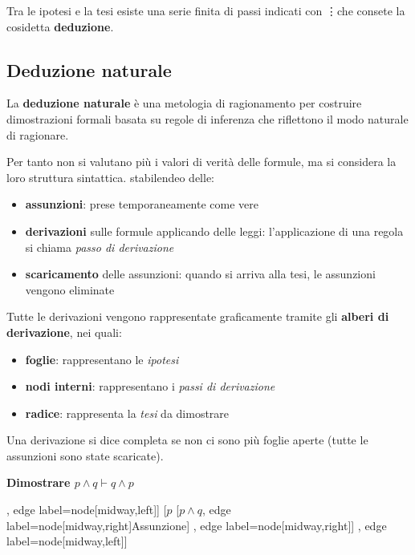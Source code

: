 \documentclass[a4paper, 12pt]{book}
\newcommand{\definizione}[2]{%
\vspace{15pt}%
\begin{tcolorbox}[
  colback=cyan!5!white,
  colframe=blue!50!black,
  title=\textbf{Definizione: #1}, %
  coltitle=white,
  fonttitle=\bfseries,
  arc=3mm,
  boxrule=0.5pt,
  enhanced,
  breakable
]
#2 %
\end{tcolorbox}
\vspace{15pt}%
}
\newcommand{\esempio}[2]{%
  \begin{center}
    \textbf{#1}\par
    #2
  \end{center}
}
\begin{document}
  Tra le ipotesi e la tesi esiste una serie finita di passi indicati con \vdots che consete la cosidetta \textbf{deduzione}.

  \subsection*{Deduzione naturale}
  La \textbf{deduzione naturale} è una metologia di ragionamento per costruire dimostrazioni formali basata su regole di inferenza che riflettono il modo naturale di ragionare.

  Per tanto non si valutano più i valori di verità delle formule, ma si considera la loro struttura sintattica. stabilendeo delle:
  \begin{itemize}
    \item \textbf{assunzioni}: prese temporaneamente come vere
    \item \textbf{derivazioni} sulle formule applicando delle leggi: l'applicazione di una regola si chiama \textit{passo di derivazione}
    \item \textbf{scaricamento} delle assunzioni: quando si arriva alla tesi, le assunzioni vengono eliminate
  \end{itemize}

  Tutte le derivazioni vengono rappresentate graficamente tramite gli \textbf{alberi di derivazione}, nei quali:
  \begin{itemize}
    \item \textbf{foglie}: rappresentano le \textit{ipotesi}
    \item \textbf{nodi interni}: rappresentano i \textit{passi di derivazione}
    \item \textbf{radice}: rappresenta la \textit{tesi} da dimostrare
  \end{itemize}

  \definizione{derivazione completa}{Una derivazione si dice completa se non ci sono più foglie aperte (tutte le assunzioni sono state scaricate).}

  \esempio{Dimostrare $p \land q \vdash q \land p$}{
    \begin{forest}
      [$q \land p$
        [$q$
          [$p \land q$, edge label={node[midway,left]{Assunzione}}]
          , edge label={node[midway,left]}]
        [$p$
          [$p \land q$, edge label={node[midway,right]{Assunzione}}]
          , edge label={node[midway,right]}]
        , edge label={node[midway,left]}]
    \end{forest}
  }
\end{document}
